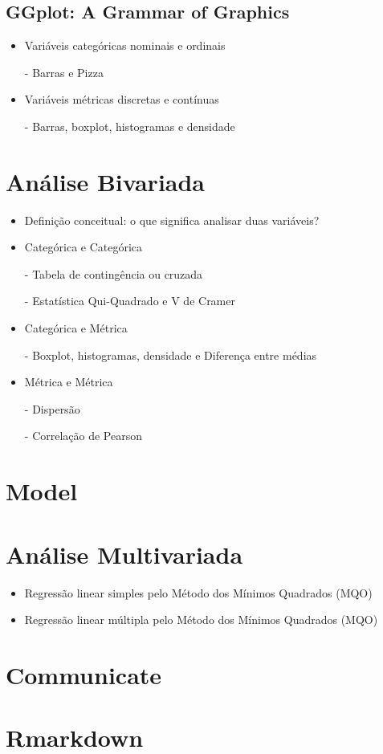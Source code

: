 \documentclass[a4paper,12pt]{article}
\begin{document}
\subsection*{GGplot: A Grammar of Graphics \cite{wickham2016}}
\begin{itemize}
    \item Variáveis categóricas nominais e ordinais

    \item[-] Barras e Pizza

     \item Variáveis métricas discretas e contínuas

     \item[-] Barras, boxplot, histogramas e densidade
\end{itemize}

\pagebreak

\section*{Análise Bivariada}

\begin{itemize}
    \item Definição conceitual: o que significa analisar duas variáveis?

    \item Categórica e Categórica

    \item[-] Tabela de contingência ou cruzada

    \item[-] Estatística Qui-Quadrado e V de Cramer

     \item Categórica e Métrica

     \item[-] Boxplot, histogramas, densidade e Diferença entre médias

     \item Métrica e Métrica
     \item[-] Dispersão
     \item[-] Correlação de Pearson
     
\end{itemize}

\section{Model}
\section*{Análise Multivariada}


\begin{itemize}
    \item Regressão linear simples pelo Método dos Mínimos Quadrados (MQO)
     
     \item Regressão linear múltipla pelo Método dos Mínimos Quadrados (MQO)
     
\end{itemize}

\section{Communicate}
\section*{Rmarkdown}

\printbibliography %
\end{document}
